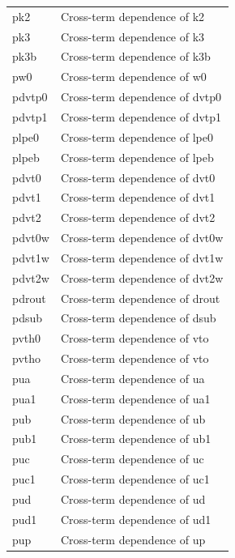 \begin{longtable}{l l}
{\small pk2} & {\small Cross-term dependence of k2} \\
{\small pk3} & {\small Cross-term dependence of k3} \\
{\small pk3b} & {\small Cross-term dependence of k3b} \\
{\small pw0} & {\small Cross-term dependence of w0} \\
{\small pdvtp0} & {\small Cross-term dependence of dvtp0} \\
{\small pdvtp1} & {\small Cross-term dependence of dvtp1} \\
{\small plpe0} & {\small Cross-term dependence of lpe0} \\
{\small plpeb} & {\small Cross-term dependence of lpeb} \\
{\small pdvt0} & {\small Cross-term dependence of dvt0} \\
{\small pdvt1} & {\small Cross-term dependence of dvt1} \\
{\small pdvt2} & {\small Cross-term dependence of dvt2} \\
{\small pdvt0w} & {\small Cross-term dependence of dvt0w} \\
{\small pdvt1w} & {\small Cross-term dependence of dvt1w} \\
{\small pdvt2w} & {\small Cross-term dependence of dvt2w} \\
{\small pdrout} & {\small Cross-term dependence of drout} \\
{\small pdsub} & {\small Cross-term dependence of dsub} \\
{\small pvth0} & {\small Cross-term dependence of vto} \\
{\small pvtho} & {\small Cross-term dependence of vto} \\
{\small pua} & {\small Cross-term dependence of ua} \\
{\small pua1} & {\small Cross-term dependence of ua1} \\
{\small pub} & {\small Cross-term dependence of ub} \\
{\small pub1} & {\small Cross-term dependence of ub1} \\
{\small puc} & {\small Cross-term dependence of uc} \\
{\small puc1} & {\small Cross-term dependence of uc1} \\
{\small pud} & {\small Cross-term dependence of ud} \\
{\small pud1} & {\small Cross-term dependence of ud1} \\
{\small pup} & {\small Cross-term dependence of up} \\

\end{longtable}

